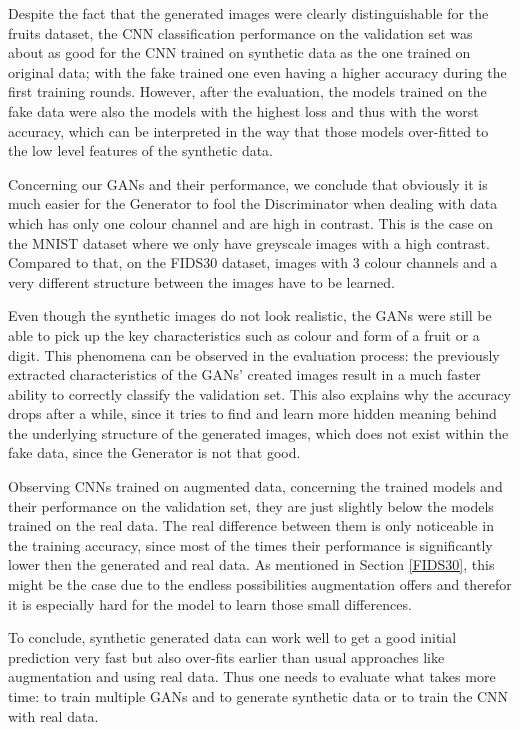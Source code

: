\documentclass[13pt]{article}
\begin{document}
Despite the fact that the generated images were clearly distinguishable for the fruits dataset, the CNN classification performance on the validation set was about as good for the CNN trained on synthetic data as the one trained on original data; with the fake trained one even having a higher accuracy during the first training rounds. However, after the evaluation, the models trained on the fake data were also the models with the highest loss and thus with the worst accuracy, which can be interpreted in the way that those models over-fitted to the low level features of the synthetic data.

Concerning our GANs and their performance, we conclude that obviously it is much easier for the Generator to fool the Discriminator when dealing with data which has only one colour channel and are high in contrast. This is the case on the MNIST dataset where we only have greyscale images with a high contrast. Compared to that, on the FIDS30 dataset, images with 3 colour channels and a very different structure between the images have to be learned.

Even though the synthetic images do not look realistic, the GANs were still be able to pick up the key characteristics such as colour and form of a fruit or a digit. This phenomena can be observed in the evaluation process: the previously extracted characteristics of the GANs' created images result in a much faster ability to correctly classify the validation set. This also explains why the accuracy drops after a while, since it tries to find and learn more hidden meaning behind the underlying structure of the generated images, which does not exist within the fake data, since the Generator is not that good.

Observing CNNs trained on augmented data, concerning the trained models and their performance on the validation set, they are just slightly below the models trained on the real data. The real difference between them is only noticeable in the training accuracy, since most of the times their performance is significantly lower then the generated and real data. As mentioned in Section \ref{FIDS30}, this might be the case due to the endless possibilities augmentation offers and therefor it is especially hard for the model to learn those small differences.

To conclude, synthetic generated data can work well to get a good initial prediction very fast but also over-fits earlier than usual approaches like augmentation and using real data. Thus one needs to evaluate what takes more time: to train multiple GANs and to generate synthetic data or to train the CNN with real data.
\end{document}
